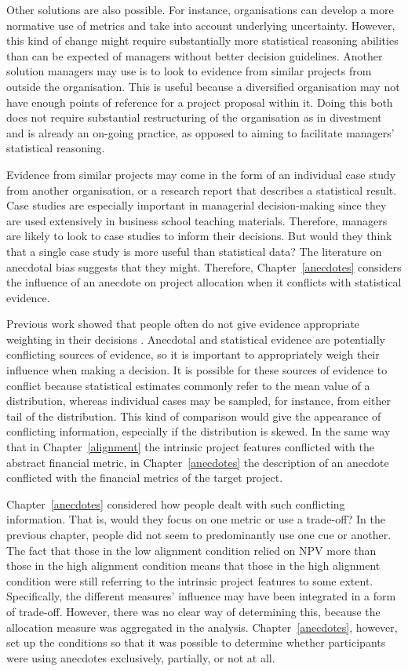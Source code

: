 \documentclass[a4paper, nobind, dvipsnames]{templates/ociamthesis}
\theoremstyle{definition}
\theoremstyle{definition}
\theoremstyle{definition}
\theoremstyle{definition}
\theoremstyle{remark}
\begin{document}
Other solutions are also possible. For instance, organisations can develop a
more normative use of metrics and take into account underlying uncertainty.
However, this kind of change might require substantially more statistical
reasoning abilities than can be expected of managers without better decision
guidelines. Another solution managers may use is to look to evidence from
similar projects from outside the organisation. This is useful because a
diversified organisation may not have enough points of reference for a project
proposal within it. Doing this both does not require substantial restructuring
of the organisation as in divestment and is already an on-going practice, as
opposed to aiming to facilitate managers' statistical reasoning.

Evidence from similar projects may come in the form of an individual case study
from another organisation, or a research report that describes a statistical
result. Case studies are especially important in managerial decision-making
since they are used extensively in business school teaching materials.
Therefore, managers are likely to look to case studies to inform their
decisions. But would they think that a single case study is more useful than
statistical data? The literature on anecdotal bias suggests that they might.
Therefore, Chapter~\ref{anecdotes} considers the influence of an anecdote on
project allocation when it conflicts with statistical evidence.

Previous work showed that people often do not give evidence appropriate
weighting in their decisions \autocite{griffin1992}. Anecdotal and statistical evidence
are potentially conflicting sources of evidence, so it is important to
appropriately weigh their influence when making a decision. It is possible for
these sources of evidence to conflict because statistical estimates commonly
refer to the mean value of a distribution, whereas individual cases may be
sampled, for instance, from either tail of the distribution. This kind of
comparison would give the appearance of conflicting information, especially if
the distribution is skewed. In the same way that in Chapter~\ref{alignment} the
intrinsic project features conflicted with the abstract financial metric, in
Chapter~\ref{anecdotes} the description of an anecdote conflicted with the
financial metrics of the target project.

Chapter~\ref{anecdotes} considered how people dealt with such conflicting
information. That is, would they focus on one metric or use a trade-off? In the
previous chapter, people did not seem to predominantly use one cue or another.
The fact that those in the low alignment condition relied on NPV more than those
in the high alignment condition means that those in the high alignment condition
were still referring to the intrinsic project features to some extent.
Specifically, the different measures' influence may have been integrated in a
form of trade-off. However, there was no clear way of determining this, because
the allocation measure was aggregated in the analysis. Chapter~\ref{anecdotes},
however, set up the conditions so that it was possible to determine whether
participants were using anecdotes exclusively, partially, or not at all.
\end{document}
